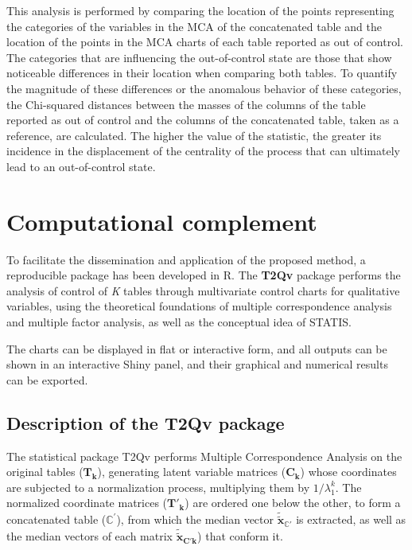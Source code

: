 \documentclass[mathematics,article,submit,moreauthors,pdftex]{mdpi}
\begin{document}
This analysis is performed by comparing the location of the points
representing the categories of the variables in the MCA of the
concatenated table and the location of the points in the MCA charts of
each table reported as out of control. The categories that are
influencing the out-of-control state are those that show noticeable
differences in their location when comparing both tables. To quantify
the magnitude of these differences or the anomalous behavior of these
categories, the Chi-squared distances between the masses of the columns
of the table reported as out of control and the columns of the
concatenated table, taken as a reference, are calculated. The higher the
value of the statistic, the greater its incidence in the displacement of
the centrality of the process that can ultimately lead to an
out-of-control state.

\hypertarget{computational-complement}{%
\section{Computational complement}\label{computational-complement}}

To facilitate the dissemination and application of the proposed method,
a reproducible package has been developed in R. The \textbf{T2Qv}
package \citep{T2Qv} performs the analysis of control of \emph{K} tables
through multivariate control charts for qualitative variables, using the
theoretical foundations of multiple correspondence analysis and multiple
factor analysis, as well as the conceptual idea of STATIS.

The charts can be displayed in flat or interactive form, and all outputs
can be shown in an interactive Shiny panel, and their graphical and
numerical results can be exported.

\hypertarget{description-of-the-t2qv-package}{%
\subsection{Description of the T2Qv
package}\label{description-of-the-t2qv-package}}

The statistical package T2Qv performs Multiple Correspondence Analysis
on the original tables (\(\mathbf{T_k}\)), generating latent variable
matrices (\(\mathbf{C_k}\)) whose coordinates are subjected to a
normalization process, multiplying them by \(1/\lambda_{1}^{k}\). The
normalized coordinate matrices (\(\mathbf{T'_k}\)) are ordered one below
the other, to form a concatenated table (\(\mathbb{C}^{'}\)), from which
the median vector \(\tilde{\tilde{\mathbf{x}}}_{\mathbb{C'}}\) is
extracted, as well as the median vectors of each matrix
\(\tilde{\tilde{\mathbf{x}}}_{\mathbf{C'{k}}}\)) that conform it.
\end{document}
